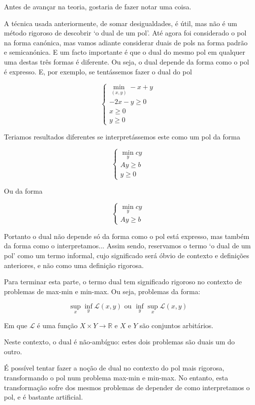 \documentclass{article}
\newcommand{\R}{\mathbb{R}}
\theoremstyle{definition}
\begin{document}
	Antes de avançar na teoria, gostaria de fazer notar uma coisa.
	
	A técnica usada anteriormente, de somar desigualdades, é útil, mas não é um método rigoroso de descobrir `o dual de um pol'. Até agora foi considerado o pol na forma canónica, mas vamos adiante considerar duais de pols na forma padrão e semicanónica. E um facto importante é que o dual do mesmo pol em qualquer uma destas três formas é diferente. Ou seja, o dual depende da forma como o pol é expresso. E, por exemplo, se tentássemos fazer o dual do pol
	
	\[
	\begin{cases}
	\min\limits_{(x,y)} -x+y\\
	-2x-y \geq 0\\
	x \geq 0\\
	y \geq 0
	\end{cases}
	\]
	
	Teriamos resultados diferentes se interpretássemos este como um pol da forma
	
	\[
	\begin{cases}
	\min\limits_y c y\\
	A y \geq b\\
	y \geq 0
	\end{cases}
	\]
	
	Ou da forma
	
	\[
	\begin{cases}
	\min\limits_y c y\\
	A y \geq b
	\end{cases}
	\]
	
	Portanto o dual não depende só da forma como o pol está expresso, mas também da forma como o interpretamos... Assim sendo, reservamos o termo `o dual de um pol' como um termo informal, cujo significado será óbvio de contexto e definições anteriores, e não como uma definição rigorosa.
	
	Para terminar esta parte, o termo dual tem significado rigoroso no contexto de problemas de max-min e min-max. Ou seja, problemas da forma:
	
	\[\sup\limits_x \inf\limits_y \mathscr{L}(x,y) \text{ ou } \inf\limits_y \sup\limits_x \mathscr{L}(x,y)\]
	
	Em que $\mathscr{L}$ é uma função $X \times Y \rightarrow \R$ e $X$ e $Y$ são conjuntos arbitários.
	
	Neste contexto, o dual é não-ambíguo: estes dois problemas são duais um do outro.
	
	É possível tentar fazer a noção de dual no contexto do pol mais rigorosa, transformando o pol num problema max-min e min-max. No entanto, esta transformação sofre dos mesmos problemas de depender de como interpretamos o pol, e é bastante artificial.
	
\end{document}
